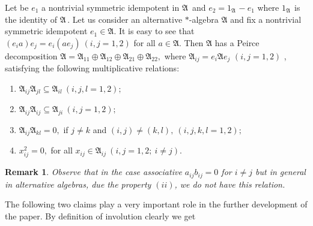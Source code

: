 \documentclass{amsart}
\newtheorem{remark}{Remark}[section]
\def\A{{\mathfrak A}\, }
\begin{document}
Let be $e_1$ a nontrivial symmetric idempotent in $\A$ and $e_2 = 1_{\A} - e_1$ where $1_{\A}$ is the identity of $\A$. Let us consider an alternative $*$-algebra $\mathfrak{A}$ and fix a nontrivial symmetric idempotent $e_{1}\in\mathfrak{A}$. It is easy to see that $(e_ia) e_j=e_i(ae_j)~(i,j=1,2)$ for all $a\in \mathfrak{A}$. Then $\mathfrak{A}$ has a Peirce decomposition
$\mathfrak{A}=\mathfrak{A}_{11}\oplus \mathfrak{A}_{12}\oplus
\mathfrak{A}_{21}\oplus \mathfrak{A}_{22},$ where
$\mathfrak{A}_{ij}=e_{i}\mathfrak{A}e_{j}$ $(i,j=1,2)$ \cite{He}, satisfying the following multiplicative relations:
\begin{enumerate}\label{asquatro}
\item [\it (i)] $\mathfrak{A}_{ij}\mathfrak{A}_{jl}\subseteq\mathfrak{A}_{il}\
(i,j,l=1,2);$
\item [\it (ii)] $\mathfrak{A}_{ij}\mathfrak{A}_{ij}\subseteq \mathfrak{A}_{ji}\
(i,j=1,2);$
\item [\it (iii)] $\mathfrak{A}_{ij}\mathfrak{A}_{kl}=0,$ if $j\neq k$ and
$(i,j)\neq (k,l),\ (i,j,k,l=1,2);$
\item [\it (iv)] $x_{ij}^{2}=0,$ for all $x_{ij}\in \mathfrak{A}_{ij}\ (i,j=1,2;~i\neq j)$.
\end{enumerate}






\begin{remark}


Observe that in the case associative $a_{ij}b_{ij} = 0$ for $i \neq j$ but in general in alternative algebras, due the property $(ii)$, we do not have this relation.
\end{remark}




The following two claims play a very important role in the further development of the paper. By definition of involution clearly we get
 
\end{document}
